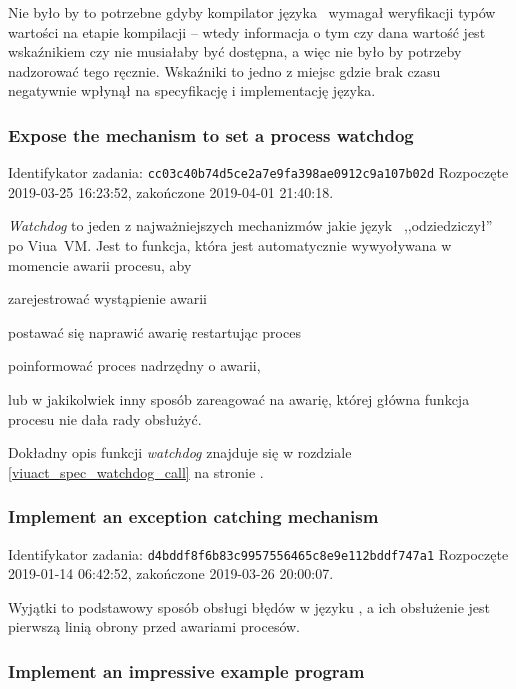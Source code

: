 Nie było by to potrzebne gdyby kompilator języka \ViuAct\ wymagał weryfikacji
typów wartości na etapie kompilacji -- wtedy informacja o tym czy dana wartość
jest wskaźnikiem czy nie musiałaby być dostępna, a więc nie było by potrzeby
nadzorować tego ręcznie. Wskaźniki to jedno z miejsc gdzie brak czasu negatywnie
wpłynął na specyfikację i implementację języka.

\subsubsection{Expose the mechanism to set a process watchdog}

Identifykator zadania: \texttt{cc03c40b74d5ce2a7e9fa398ae0912c9a107b02d}
\newline
Rozpoczęte 2019-03-25 16:23:52, zakończone 2019-04-01 21:40:18.
\newline

\emph{Watchdog} to jeden z najważniejszych mechanizmów jakie język \ViuAct\ 
,,odziedziczył'' po Viua~VM. Jest to funkcja, która jest automatycznie
wywyoływana w momencie awarii procesu, aby
\begin{enumerate*}[label=(\arabic*)]
    \item zarejestrować wystąpienie awarii
    \item postawać się naprawić awarię restartując proces
    \item poinformować proces nadrzędny o awarii,
\end{enumerate*}
lub w jakikolwiek inny sposób zareagować na awarię, której główna funkcja
procesu nie dała rady obsłużyć.

Dokładny opis funkcji \emph{watchdog} znajduje się w rozdziale
\ref{viuact_spec_watchdog_call} na stronie \pageref{viuact_spec_watchdog_call}.

\subsubsection{Implement an exception catching mechanism}

Identifykator zadania: \texttt{d4bddf8f6b83c9957556465c8e9e112bddf747a1}
\newline
Rozpoczęte 2019-01-14 06:42:52, zakończone 2019-03-26 20:00:07.
\newline

Wyjątki to podstawowy sposób obsługi błędów w języku \ViuAct, a ich obsłużenie
jest pierwszą linią obrony przed awariami procesów.

\subsubsection{Implement an impressive example program}

